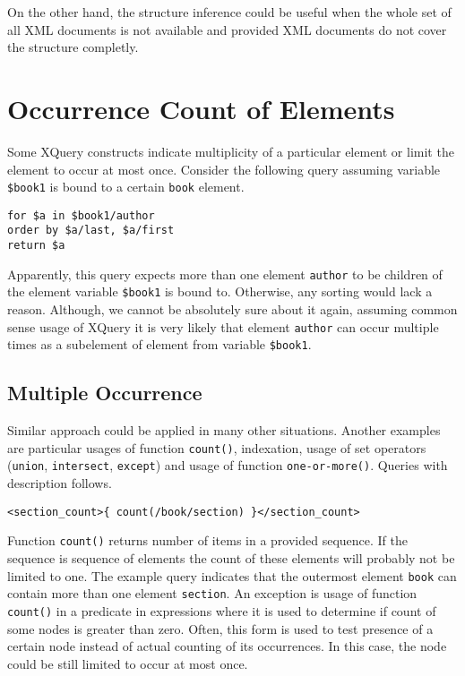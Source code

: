 On the other hand, the structure inference could be useful when the whole set of all XML documents is not available and provided XML documents do not cover the structure completly.

\section{Occurrence Count of Elements}
Some XQuery constructs indicate multiplicity of a particular element or limit the element to occur at most once. Consider the following query assuming variable \texttt{\$book1} is bound to a certain \texttt{book} element.

\begin{verbatim}
for $a in $book1/author 
order by $a/last, $a/first
return $a
\end{verbatim}

Apparently, this query expects more than one element \texttt{author} to be children of the element variable \texttt{\$book1} is bound to. Otherwise, any sorting would lack a reason. Although, we cannot be absolutely sure about it again, assuming common sense usage of XQuery it is very likely that element \texttt{author} can occur multiple times as a subelement of element from variable \texttt{\$book1}.

\subsection{Multiple Occurrence}
Similar approach could be applied in many other situations. Another examples are particular usages of function \texttt{count()}, indexation, usage of set operators (\texttt{union}, \texttt{intersect}, \texttt{except}) and usage of function \texttt{one-or-more()}. Queries with description follows.

\begin{verbatim}
<section_count>{ count(/book/section) }</section_count>
\end{verbatim}

Function \texttt{count()} returns number of items in a provided sequence. If the sequence is sequence of elements the count of these elements will probably not be limited to one. The example query indicates that the outermost element \texttt{book} can contain more than one element \texttt{section}.
An exception is usage of function \texttt{count()} in a predicate in expressions where it is used to determine if count of some nodes is greater than zero. Often, this form is used to test presence of a certain node instead of actual counting of its occurrences. In this case, the node could be still limited to occur at most once.

